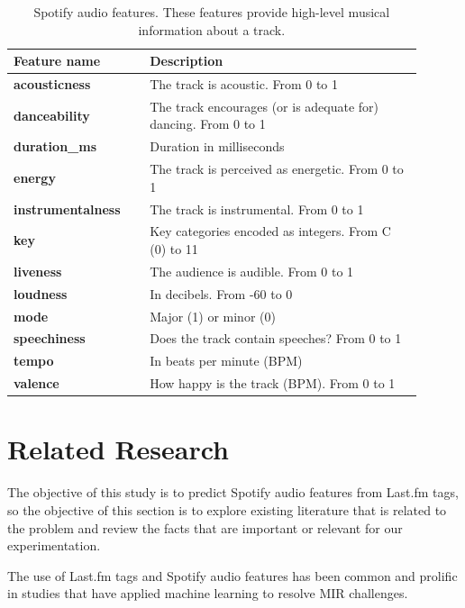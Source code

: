 \documentclass[sn-mathphys]{sn-jnl}%
\theoremstyle{thmstyleone}%
\theoremstyle{thmstyletwo}%
\theoremstyle{thmstylethree}%
\begin{document}
\begin{table}[h!]
      \centering
      \caption{Spotify audio features. These features provide high-level musical information about a track.} \label{table:spotify-features}
      \begin{tabular}{p{0.3\linewidth}p{0.6\linewidth}}
          \toprule
          \bfseries \textbf{Feature name} & \textbf{Description} \\
          \midrule
          \textbf{acousticness} & The track is acoustic. From 0 to 1 \\
          \textbf{danceability} & The track encourages (or is adequate for) dancing. From 0 to 1 \\
          \textbf{duration\_ms}  &  Duration in milliseconds \\
          \textbf{energy}  &  The track is perceived as energetic. From 0 to 1\\
          \textbf{instrumentalness}  &  The track is instrumental. From 0 to 1 \\
          \textbf{key}  &  Key categories encoded as integers. From C (0) to 11 \\
          \textbf{liveness}  &  The audience is audible. From 0 to 1\\
          \textbf{loudness}  &  In decibels. From -60 to 0 \\
          \textbf{mode}  & Major (1) or minor (0) \\
          \textbf{speechiness}  & Does the track contain speeches? From 0 to 1 \\
          \textbf{tempo}  & In beats per minute (BPM) \\
          \textbf{valence} & How happy is the track (BPM). From 0 to 1 \\
          \bottomrule
      \end{tabular}
  \end{table}


\section{Related Research}\label{sec3}

The objective of this study is to predict Spotify audio features from Last.fm tags, so the objective of this section is to
explore existing literature that is related to the problem and review the facts that are important or relevant for our experimentation.

The use of Last.fm tags and Spotify audio features has been common and prolific in studies
that have applied machine learning to resolve MIR challenges.
\end{document}
